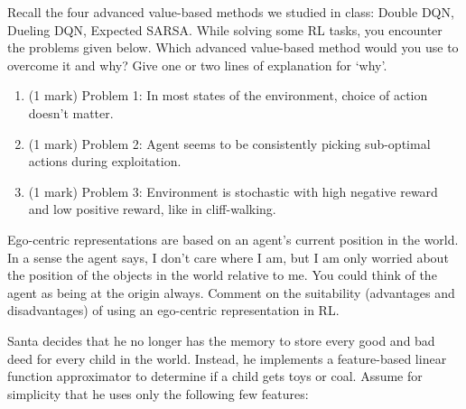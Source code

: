\documentclass[addpoints,12pt,solution]{exam}
\begin{document}
\begin{questions}

\question[3] Recall the four advanced value-based methods we studied in class: Double DQN, Dueling DQN, Expected SARSA.
While solving some RL tasks, you encounter the problems given below. Which advanced value-based method would you use to overcome it and why? Give one or two lines of explanation for `why’.
\begin{enumerate}[label=(\alph*)]
    \item (1 mark) Problem 1: In most states of the environment, choice of action doesn’t matter.
    \begin{solution}

    \end{solution}
    \item (1 mark) Problem 2: Agent seems to be consistently picking sub-optimal actions during exploitation.
    \begin{solution}
 
    \end{solution}
    \item (1 mark) Problem 3: Environment is stochastic with high negative reward and low positive reward, like in cliff-walking.
    \begin{solution}
    
    \end{solution}
\end{enumerate}


\question[4] Ego-centric representations are based on an agent’s current position in the world. In a sense the agent says, I don’t care where I am, but I am only worried about the position of the objects in the world relative to me. You could think of the agent as being at the origin always. Comment on the suitability (advantages and disadvantages) of using an ego-centric representation in RL.

\begin{solution}


\end{solution}

\question[12]
Santa decides that he no longer has the memory to store every good and bad deed for every child in the world. Instead, he implements a feature-based linear function approximator to determine if a child gets toys or coal. Assume for simplicity that he uses only the following few features:


\end{questions}
\end{document}
